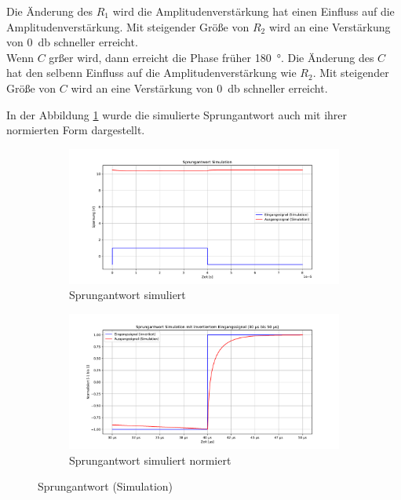 Die Änderung des $R_1$ wird die Amplitudenverstärkung hat einen Einfluss auf die Amplitudenverstärkung. Mit steigender Größe von $R_2$ wird an eine Verstärkung von \SI{0}{\decibel} schneller erreicht.\\

Wenn $C$ grßer wird, dann erreicht die Phase früher \SI{180}{\degree}. Die Änderung des $C$ hat den selbenn Einfluss auf die Amplitudenverstärkung wie $R_2$. Mit steigender Größe von $C$ wird an eine Verstärkung von \SI{0}{\decibel} schneller erreicht.


In der Abbildung \ref{fig:Sprungantwort simuliert} wurde die simulierte Sprungantwort auch mit ihrer normierten Form dargestellt.


\begin{figure}[H]
  \begin{subfigure}{0.5\textwidth} %
    \centering
    \includegraphics[width=\linewidth]{Elektronik-Laborprotokoll_Filter/Plots/Sprungantwort_Simulation_Plot.pdf}
    \caption{Sprungantwort simuliert}
  \end{subfigure}
  \begin{subfigure}{0.5\textwidth} %
    \centering
    \includegraphics[width=\linewidth]{Elektronik-Laborprotokoll_Filter/Plots/Sprungantwort_Simulation_normiert.pdf}
    \caption{Sprungantwort simuliert normiert}
  \end{subfigure}
 \caption{Sprungantwort (Simulation) }
 \label{fig:Sprungantwort simuliert}
\end{figure}

